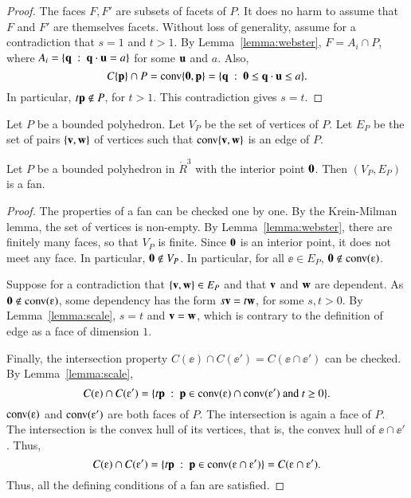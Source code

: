 \begin{proof}  The faces $F,F'$ are subsets of facets of $P$.  It does no harm to assume that $F$ and $F'$ are themselves facets.   Without loss of generality, assume for a contradiction that $s=1$ and $t>1$.  By Lemma~\ref{lemma:webster}, 
 $F = A_i \cap P$, where $A_i = \{{\mathbf q} \ :\  {\mathbf q}\cdot {\mathbf u} = a\}$ for some ${\mathbf u}$ and $a$.  Also, 
$$
C\{{\mathbf p}\}\cap P = {\operatorname{conv}}\{{\mathbf 0},{\mathbf p}\} = \{{\mathbf q} \ :\  {\mathbf 0}\le {\mathbf q}\cdot {\mathbf u} \le a\}.
$$
In particular, $t {\mathbf p}\not\in P$, for $t>1$.  This contradiction gives $s = t$.
\end{proof}





\begin{definition}[$(V_P,E_P)$] Let $P$ be a bounded polyhedron.
Let $V_P$ be the set of vertices of $P$.  Let $E_P$ be the set of pairs $\{{\mathbf v},{\mathbf w}\}$ of vertices such that ${\operatorname{conv}}\{{\mathbf v},{\mathbf w}\}$ is an edge of $P$.
\end{definition}
%
%

\begin{lemma}\label{lemma:polyhedron}%
Let $P$ be a bounded polyhedron in $\ring{R}^3$ with the interior point ${\mathbf 0}$.
Then $(V_P,E_P)$ is a fan.
\end{lemma}
%

\begin{proof} The properties of a fan can be checked one by one.
By the Krein-Milman lemma, the set of vertices is non-empty.  By Lemma~\ref{lemma:webster}, there are finitely many faces, so that $V_P$ is finite.  Since ${\mathbf 0}$ is an interior point, it does not meet any face.  In particular, ${\mathbf 0}\not\in V_P$.   In particular,
for all $\ee\in E_P$, 
$\orz\not\in \op{conv}(\ee)$.

Suppose for a contradiction that $\{{\mathbf v},{\mathbf w}\}\in E_P$ and that ${\mathbf v}$ and ${\mathbf w}$ are dependent.  As $\orz\not\in \op{conv}(\ee)$, some dependency has the form $s {\mathbf v} = t {\mathbf w}$, for some $s, t>0$.  By Lemma~\ref{lemma:scale}, $s=t$ and ${\mathbf v}={\mathbf w}$, which is contrary to the definition of edge as a face of dimension $1$.

Finally, the intersection property $C(\ee)\cap C(\ee') = C(\ee \cap \ee')$ can be checked.
By Lemma~\ref{lemma:scale},
$$
C(\ee) \cap C(\ee') = \{t \p \mid \p\in \op{conv}(\ee) \cap \op{conv}(\ee') \text{ and } t \ge 0\}.
$$
$\op{conv}(\ee)$ and $\op{conv}(\ee')$ are both faces of $P$.  The intersection is again a face of $P$.  The intersection is the convex hull of its vertices, that is, the convex hull of $\ee \cap \ee'$.  Thus,
$$
C(\ee)\cap C(\ee') = \{t \p \mid \p\in \op{conv}(\ee\cap \ee')\} = C(\ee \cap \ee').
$$
Thus, all the defining conditions of a fan are satisfied.
\end{proof}


